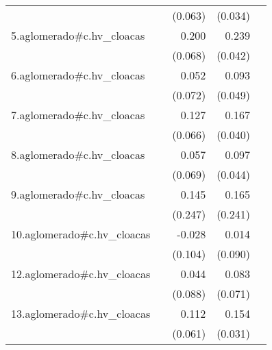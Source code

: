 {\begin{longtable}{l*{4}{D{.}{.}{-1}}}
            &                     &     (0.063)         &     (0.034)         &                     \\
\addlinespace
5.aglomerado#c.hv\_cloacas&                     &       0.200\sym{**} &       0.239\sym{***}&                     \\
            &                     &     (0.068)         &     (0.042)         &                     \\
\addlinespace
6.aglomerado#c.hv\_cloacas&                     &       0.052         &       0.093         &                     \\
            &                     &     (0.072)         &     (0.049)         &                     \\
\addlinespace
7.aglomerado#c.hv\_cloacas&                     &       0.127         &       0.167\sym{***}&                     \\
            &                     &     (0.066)         &     (0.040)         &                     \\
\addlinespace
8.aglomerado#c.hv\_cloacas&                     &       0.057         &       0.097\sym{*}  &                     \\
            &                     &     (0.069)         &     (0.044)         &                     \\
\addlinespace
9.aglomerado#c.hv\_cloacas&                     &       0.145         &       0.165         &                     \\
            &                     &     (0.247)         &     (0.241)         &                     \\
\addlinespace
10.aglomerado#c.hv\_cloacas&                     &      -0.028         &       0.014         &                     \\
            &                     &     (0.104)         &     (0.090)         &                     \\
\addlinespace
12.aglomerado#c.hv\_cloacas&                     &       0.044         &       0.083         &                     \\
            &                     &     (0.088)         &     (0.071)         &                     \\
\addlinespace
13.aglomerado#c.hv\_cloacas&                     &       0.112         &       0.154\sym{***}&                     \\
            &                     &     (0.061)         &     (0.031)         &                     \\

\end{longtable}}
